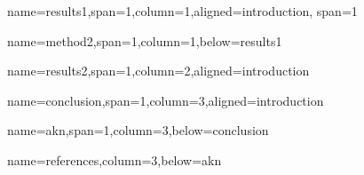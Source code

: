 \documentclass[paperwidth=160cm,paperheight=100cm,landscape,fontscale=0.2941]{baposter}
\begin{document}
\begin{poster}
{name=results1,span=1,column=1,aligned=introduction, span=1}
{\parskip 5pt 

}


{name=method2,span=1,column=1,below=results1}
{\parskip 5pt 


}

{name=results2,span=1,column=2,aligned=introduction}
{\parskip 5pt


}


{name=conclusion,span=1,column=3,aligned=introduction}
{\parskip 5pt

}


{name=akn,span=1,column=3,below=conclusion}
{\parskip 5pt

}


{name=references,column=3,below=akn}
{
\renewcommand{\section}[2]{}%
\footnotesize
}



\end{poster}
\end{document}
